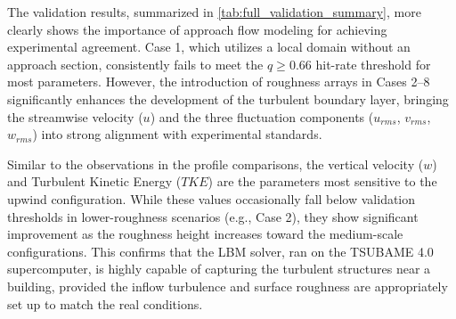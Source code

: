 The validation results, summarized in \autoref{tab:full_validation_summary}, more clearly shows the importance of approach flow modeling for achieving experimental agreement. Case 1, which utilizes a local domain without an approach section, consistently fails to meet the $q \ge 0.66$ hit-rate threshold for most parameters. However, the introduction of roughness arrays in Cases 2--8 significantly enhances the development of the turbulent boundary layer, bringing the streamwise velocity ($u$) and the three fluctuation components ($u_{rms}$, $v_{rms}$, $w_{rms}$) into strong alignment with experimental standards.

Similar to the observations in the profile comparisons, the vertical velocity ($w$) and Turbulent Kinetic Energy ($TKE$) are the parameters most sensitive to the upwind configuration. While these values occasionally fall below validation thresholds in lower-roughness scenarios (e.g., Case 2), they show significant improvement as the roughness height increases toward the medium-scale configurations. This confirms that the LBM solver, ran on the TSUBAME 4.0 supercomputer, is highly capable of capturing the turbulent structures near a building, provided the inflow turbulence and surface roughness are appropriately set up to match the real conditions.

